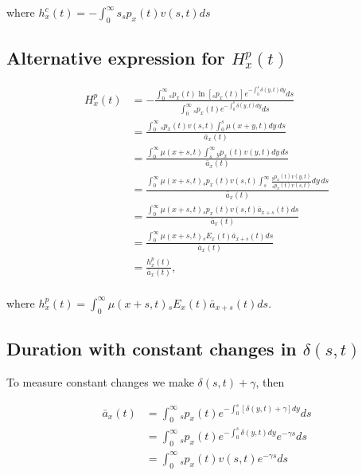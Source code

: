 \documentclass[12pt]{article}
\begin{document}
where ${h}^{c}_x(t)=-\int_0^\infty s {}_sp_x(t) {v}(s,t)ds$



\subsection{Alternative expression for ${H}^{p}_{x}(t)$}\label{sec:EntropyAlt}

\begin{equation} \label{eq:EntropyAnnuityA1}
\begin{split}
{H}^{p}_{x}(t) &= -\frac{ \int_{0}^{\infty}{}_sp_x(t)\ln[{}_sp_x(t)] e^{-\int_{0}^{s}\delta(y,t)dy} ds}{\int_0^\infty {}_sp_x(t) e^{-\int_{0}^{s}\delta(y,t)dy} ds}\\
&= \frac{\int_0^\infty {}_sp_x(t) {v}(s,t) \int_0^s \mu(x+y,t) dy\,ds}{\bar{a}_x(t)}\\
&= \frac{\int_0^\infty  \mu(x+s,t) \int_s^\infty {}_yp_x(t) {v}(y,t)  dy\,ds}{\bar{a}_x(t)}\\
&= \frac{\int_0^\infty  \mu(x+s,t)  {}_sp_x(t) {v}(s,t) \int_s^\infty \frac{ {}_yp_x(t) {v}(y,t)}{ {}_sp_x(t) {v}(s,t)}  dy\,ds}{\bar{a}_x(t)}\\
&=  \frac{\int_0^\infty \mu(x+s,t)   {}_sp_x(t) {v}(s,t) \bar{a}_{x+s}(t) ds}{\bar{a}_x(t)} \\
&=  \frac{\int_0^\infty \mu(x+s,t)   {}_sE_x(t) \bar{a}_{x+s}(t) ds}{\bar{a}_x(t)} \\
&=  \frac{{h}^{p}_{x}(t)}{\bar{a}_x(t)}, \\
\end{split}
\end{equation}

where ${h}^{p}_{x}(t)=\int_0^\infty \mu(x+s,t)   {}_sE_x(t) \bar{a}_{x+s}(t) ds$.



\subsection{Duration with constant changes in $\delta(s,t)$}\label{sec:DurConst}

To measure constant changes we make $\delta(s,t)+\gamma$, then

\begin{equation}\label{eq:DurationConst1}
\begin{split}
\bar{a}_{x}(t) &= \int_0^\infty {}_sp_x(t) e^{- \int_{0}^{s} [\delta(y,t)+\gamma]dy}ds \\
&= \int_0^\infty {}_sp_x(t) e^{- \int_{0}^{s}\delta(y,t)dy}e^{-\gamma s}ds \\
&= \int_0^\infty {}_sp_x(t) {v}(s,t)e^{-\gamma s}ds
\end{split}
\end{equation}
\end{document}
